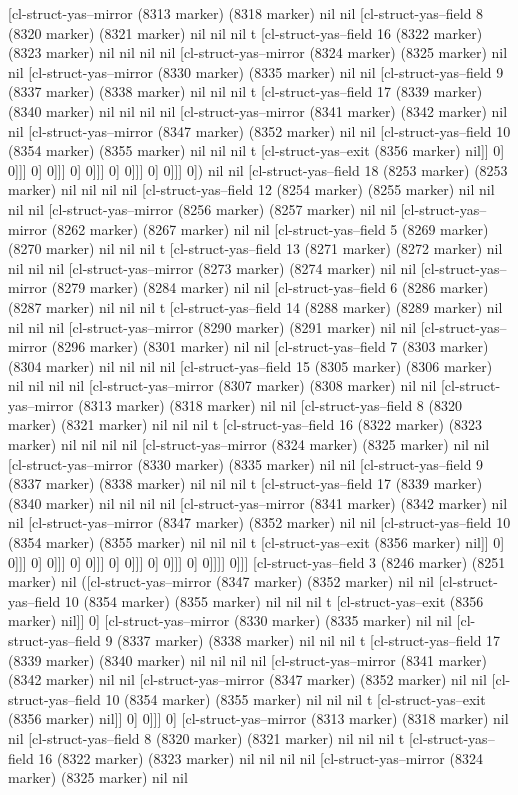 {{[cl-struct-yas--mirror (8313 marker) (8318 marker) nil nil [cl-struct-yas--field 8 (8320 marker) (8321 marker) nil nil nil t [cl-struct-yas--field 16 (8322 marker) (8323 marker) nil nil nil nil [cl-struct-yas--mirror (8324 marker) (8325 marker) nil nil [cl-struct-yas--mirror (8330 marker) (8335 marker) nil nil [cl-struct-yas--field 9 (8337 marker) (8338 marker) nil nil nil t [cl-struct-yas--field 17 (8339 marker) (8340 marker) nil nil nil nil [cl-struct-yas--mirror (8341 marker) (8342 marker) nil nil [cl-struct-yas--mirror (8347 marker) (8352 marker) nil nil [cl-struct-yas--field 10 (8354 marker) (8355 marker) nil nil nil t [cl-struct-yas--exit (8356 marker) nil]] 0] 0]]] 0] 0]]] 0] 0]]] 0] 0]]] 0] 0]]] 0]) nil nil [cl-struct-yas--field 18 (8253 marker) (8253 marker) nil nil nil nil [cl-struct-yas--field 12 (8254 marker) (8255 marker) nil nil nil nil [cl-struct-yas--mirror (8256 marker) (8257 marker) nil nil [cl-struct-yas--mirror (8262 marker) (8267 marker) nil nil [cl-struct-yas--field 5 (8269 marker) (8270 marker) nil nil nil t [cl-struct-yas--field 13 (8271 marker) (8272 marker) nil nil nil nil [cl-struct-yas--mirror (8273 marker) (8274 marker) nil nil [cl-struct-yas--mirror (8279 marker) (8284 marker) nil nil [cl-struct-yas--field 6 (8286 marker) (8287 marker) nil nil nil t [cl-struct-yas--field 14 (8288 marker) (8289 marker) nil nil nil nil [cl-struct-yas--mirror (8290 marker) (8291 marker) nil nil [cl-struct-yas--mirror (8296 marker) (8301 marker) nil nil [cl-struct-yas--field 7 (8303 marker) (8304 marker) nil nil nil nil [cl-struct-yas--field 15 (8305 marker) (8306 marker) nil nil nil nil [cl-struct-yas--mirror (8307 marker) (8308 marker) nil nil [cl-struct-yas--mirror (8313 marker) (8318 marker) nil nil [cl-struct-yas--field 8 (8320 marker) (8321 marker) nil nil nil t [cl-struct-yas--field 16 (8322 marker) (8323 marker) nil nil nil nil [cl-struct-yas--mirror (8324 marker) (8325 marker) nil nil [cl-struct-yas--mirror (8330 marker) (8335 marker) nil nil [cl-struct-yas--field 9 (8337 marker) (8338 marker) nil nil nil t [cl-struct-yas--field 17 (8339 marker) (8340 marker) nil nil nil nil [cl-struct-yas--mirror (8341 marker) (8342 marker) nil nil [cl-struct-yas--mirror (8347 marker) (8352 marker) nil nil [cl-struct-yas--field 10 (8354 marker) (8355 marker) nil nil nil t [cl-struct-yas--exit (8356 marker) nil]] 0] 0]]] 0] 0]]] 0] 0]]] 0] 0]]] 0] 0]]] 0] 0]]]] 0]]] [cl-struct-yas--field 3 (8246 marker) (8251 marker) nil ([cl-struct-yas--mirror (8347 marker) (8352 marker) nil nil [cl-struct-yas--field 10 (8354 marker) (8355 marker) nil nil nil t [cl-struct-yas--exit (8356 marker) nil]] 0] [cl-struct-yas--mirror (8330 marker) (8335 marker) nil nil [cl-struct-yas--field 9 (8337 marker) (8338 marker) nil nil nil t [cl-struct-yas--field 17 (8339 marker) (8340 marker) nil nil nil nil [cl-struct-yas--mirror (8341 marker) (8342 marker) nil nil [cl-struct-yas--mirror (8347 marker) (8352 marker) nil nil [cl-struct-yas--field 10 (8354 marker) (8355 marker) nil nil nil t [cl-struct-yas--exit (8356 marker) nil]] 0] 0]]] 0] [cl-struct-yas--mirror (8313 marker) (8318 marker) nil nil [cl-struct-yas--field 8 (8320 marker) (8321 marker) nil nil nil t [cl-struct-yas--field 16 (8322 marker) (8323 marker) nil nil nil nil [cl-struct-yas--mirror (8324 marker) (8325 marker) nil nil }}
